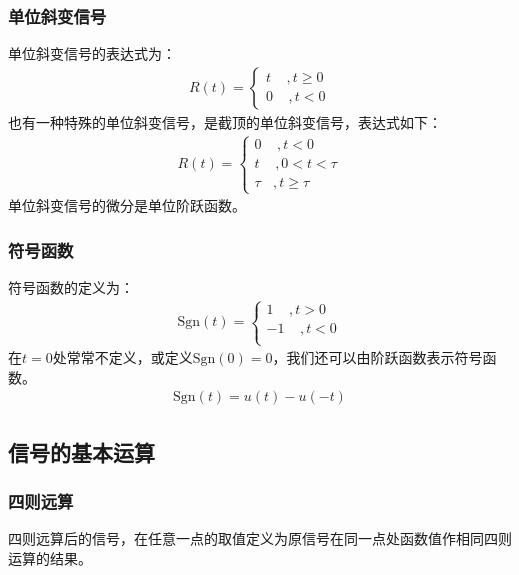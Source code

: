 \documentclass{hitreport}
\begin{document}
\subsubsection{单位斜变信号}

单位斜变信号的表达式为：
\begin{align}
	R\left( t \right) =\left\{ \begin{array}{l}
	t \ \ \ \ \ ,t\ge0\\
	0 \ \ \ \ \ ,t<0
	\end{array} \right.
\end{align}
也有一种特殊的单位斜变信号，是截顶的单位斜变信号，表达式如下：
\begin{align}
	R\left( t \right) =\left\{ \begin{array}{l}
	0 \ \ \ \ \ ,t<0\\
	t \ \ \ \ \ ,0<t<\tau\\
	\tau \ \ \ \ ,t\ge \tau
	\end{array} \right.
\end{align}
单位斜变信号的微分是单位阶跃函数。


\subsubsection{符号函数}

符号函数的定义为：
\begin{align}
	\mathrm{Sgn}\left( t \right) =\left\{ \begin{array}{l}
	1 \ \ \ \ \ ,t>0\\
	-1 \ \ \ \ \ ,t<0\\
	\end{array} \right.
\end{align}
在$t=0$处常常不定义，或定义$\mathrm{Sgn}\left(0\right) = 0$，我们还可以由阶跃函数表示符号函数。
\begin{align}
\mathrm{Sgn}\left(t\right) = u\left(t\right)-u\left(-t\right)
\end{align}

\subsection{信号的基本运算}

\subsubsection{四则远算}
四则远算后的信号，在任意一点的取值定义为原信号在同一点处函数值作相同四则运算的结果。
\end{document}
